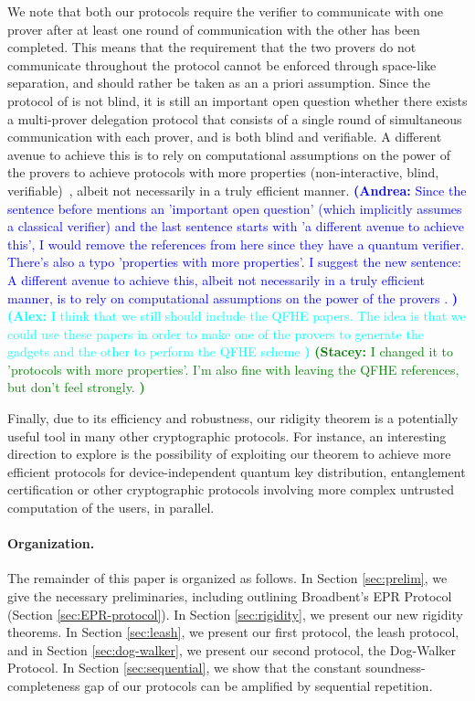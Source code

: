 \documentclass[11pt]{article}
\theoremstyle{remark}
\theoremstyle{definition}
\newcommand{\anote}[1]{\textcolor{blue}{\small {\textbf{(Andrea:} #1 \textbf{) }}}}
\newcommand{\snote}[1]{\textcolor{green}{\small {\textbf{(Stacey:} #1 \textbf{) }}}}
\newcommand{\agnote}[1]{\textcolor{cyan}{\small {\textbf{(Alex:} #1 \textbf{) }}}}
\begin{document}
We note that both our protocols require the verifier to communicate with one
prover after at least one round of communication with the other has been
completed. This means that the requirement that the two provers do not
communicate throughout the protocol cannot be enforced through space-like
separation, and should rather be taken as an a priori assumption.
Since the protocol of \cite{Grilo17} is not blind, it is still an important open question whether there exists a multi-prover
delegation protocol that consists of a single round of simultaneous
communication with each prover, and is both blind and verifiable.  A different avenue to achieve this is to rely on computational assumptions on the power of the provers to achieve protocols with more properties (non-interactive, blind, verifiable)~\cite{dulek16,alagic2017quantum,mahadev2017,mahadev2018}, albeit not necessarily in a truly efficient manner. \anote{Since the sentence before mentions an 'important open question' (which implicitly assumes a classical verifier) and the last sentence starts with 'a different avenue to achieve this', I would remove the references \cite{dulek16}\cite{alagic2017quantum} from here since they have a quantum verifier. There's also a typo 'properties with more properties'. I suggest the new sentence:  A different avenue to achieve this,  albeit not necessarily in a truly efficient manner, is to rely on computational assumptions on the power of the provers \cite{mahadev2017}\cite{mahadev2018}.}\agnote{I think that we still should include the QFHE papers. The idea is that we could use these papers in order to make one of the provers to generate the gadgets and the other to perform the QFHE scheme}\snote{I changed it to 'protocols with more properties'. I'm also fine with leaving the QFHE references, but don't feel strongly.}

Finally, due to its efficiency and robustness, our ridigity theorem is a
potentially useful tool in many other cryptographic protocols. For instance, an
interesting direction to explore is the possibility of exploiting our theorem to
achieve more efficient protocols for device-independent quantum key
distribution, entanglement certification or other cryptographic protocols
involving more complex untrusted computation of the users, in parallel.




\paragraph{Organization.} The remainder of this paper is organized as follows. In Section \ref{sec:prelim}, we give the necessary preliminaries, including outlining Broadbent's EPR Protocol (Section \ref{sec:EPR-protocol}). In Section \ref{sec:rigidity}, we present our new rigidity theorems. In Section \ref{sec:leash}, we present our first protocol, the leash protocol, and in Section \ref{sec:dog-walker}, we present our second protocol, the Dog-Walker Protocol. In Section \ref{sec:sequential}, we show that the constant soundness-completeness gap of our protocols can be amplified by sequential repetition.
\end{document}
